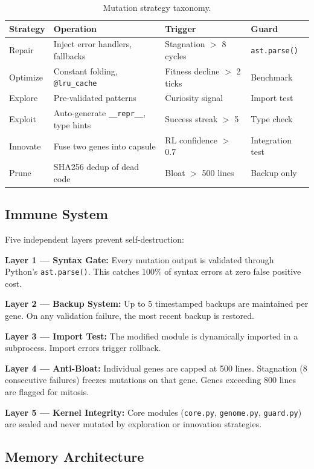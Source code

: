 \documentclass[11pt,a4paper]{article}
\begin{document}
\begin{table}[H]
\centering
\begin{tabular}{@{}llll@{}}
\toprule
\textbf{Strategy} & \textbf{Operation} & \textbf{Trigger} & \textbf{Guard} \\
\midrule
Repair & Inject error handlers, fallbacks & Stagnation $>$ 8 cycles & \texttt{ast.parse()} \\
Optimize & Constant folding, \texttt{@lru\_cache} & Fitness decline $>$ 2 ticks & Benchmark \\
Explore & Pre-validated patterns & Curiosity signal & Import test \\
Exploit & Auto-generate \texttt{\_\_repr\_\_}, type hints & Success streak $>$ 5 & Type check \\
Innovate & Fuse two genes into capsule & RL confidence $>$ 0.7 & Integration test \\
Prune & SHA256 dedup of dead code & Bloat $>$ 500 lines & Backup only \\
\bottomrule
\end{tabular}
\caption{Mutation strategy taxonomy.}
\label{tab:strategies}
\end{table}

\subsection{Immune System}

Five independent layers prevent self-destruction:

\textbf{Layer 1 — Syntax Gate:} Every mutation output is validated through Python's \texttt{ast.parse()}. This catches 100\% of syntax errors at zero false positive cost.

\textbf{Layer 2 — Backup System:} Up to 5 timestamped backups are maintained per gene. On any validation failure, the most recent backup is restored.

\textbf{Layer 3 — Import Test:} The modified module is dynamically imported in a subprocess. Import errors trigger rollback.

\textbf{Layer 4 — Anti-Bloat:} Individual genes are capped at 500 lines. Stagnation (8 consecutive failures) freezes mutations on that gene. Genes exceeding 800 lines are flagged for mitosis.

\textbf{Layer 5 — Kernel Integrity:} Core modules (\texttt{core.py}, \texttt{genome.py}, \texttt{guard.py}) are sealed and never mutated by exploration or innovation strategies.

\subsection{Memory Architecture}
\end{document}
